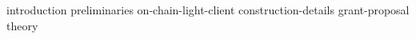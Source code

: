 {introduction}
{preliminaries}
{on-chain-light-client}
{construction-details}
{grant-proposal}
{theory}




